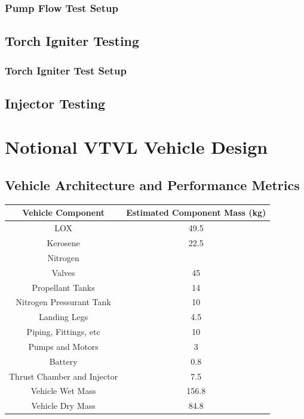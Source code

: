 \documentclass[12pt, letterpaper]{article}
\begin{document}
\subsubsection{Pump Flow Test Setup}
\subsection{Torch Igniter Testing}
\subsubsection{Torch Igniter Test Setup}
\subsection{Injector Testing}

\newpage

\section{Notional VTVL Vehicle Design}
\subsection{Vehicle Architecture and Performance Metrics}

\begin{tabular}{|c|c|}

\hline

Vehicle Component & Estimated Component Mass (kg) \\

\hline

LOX & 49.5 \\
Kerosene & 22.5 \\
Nitrogen &  \\
Valves & 45 \\
Propellant Tanks & 14 \\
Nitrogen Pressurant Tank & 10 \\
Landing Legs & 4.5 \\
Piping, Fittings, etc & 10 \\
Pumps and Motors & 3 \\
Battery & 0.8 \\
Thrust Chamber and Injector & 7.5 \\

\hline

Vehicle Wet Mass & 156.8 \\
Vehicle Dry Mass & 84.8 \\

\hline

\end{tabular}
\end{document}
